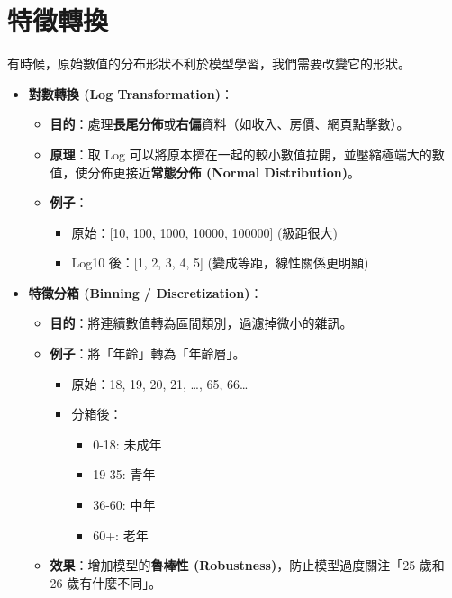 \documentclass[
  letterpaper,
  DIV=11,
  numbers=noendperiod]{scrreprt}
\providecommand{\tightlist}{%
  \setlength{\itemsep}{0pt}\setlength{\parskip}{0pt}}
\begin{document}
\section{特徵轉換}\label{sec-feature-transformation}

有時候，原始數值的分布形狀不利於模型學習，我們需要改變它的形狀。

\begin{itemize}
\tightlist
\item
  \textbf{對數轉換 (Log Transformation)}：

  \begin{itemize}
  \tightlist
  \item
    \textbf{目的}：處理\textbf{長尾分佈}或\textbf{右偏}資料（如收入、房價、網頁點擊數）。
  \item
    \textbf{原理}：取 Log
    可以將原本擠在一起的較小數值拉開，並壓縮極端大的數值，使分佈更接近\textbf{常態分佈
    (Normal Distribution)}。
  \item
    \textbf{例子}：

    \begin{itemize}
    \tightlist
    \item
      原始：{[}10, 100, 1000, 10000, 100000{]} (級距很大)
    \item
      Log10 後：{[}1, 2, 3, 4, 5{]} (變成等距，線性關係更明顯)
    \end{itemize}
  \end{itemize}
\item
  \textbf{特徵分箱 (Binning / Discretization)}：

  \begin{itemize}
  \tightlist
  \item
    \textbf{目的}：將連續數值轉為區間類別，過濾掉微小的雜訊。
  \item
    \textbf{例子}：將「年齡」轉為「年齡層」。

    \begin{itemize}
    \tightlist
    \item
      原始：18, 19, 20, 21, \ldots, 65, 66\ldots{}
    \item
      分箱後：

      \begin{itemize}
      \tightlist
      \item
        0-18: 未成年
      \item
        19-35: 青年
      \item
        36-60: 中年
      \item
        60+: 老年
      \end{itemize}
    \end{itemize}
  \item
    \textbf{效果}：增加模型的\textbf{魯棒性
    (Robustness)}，防止模型過度關注「25 歲和 26 歲有什麼不同」。
  \end{itemize}
\end{itemize}
\end{document}
